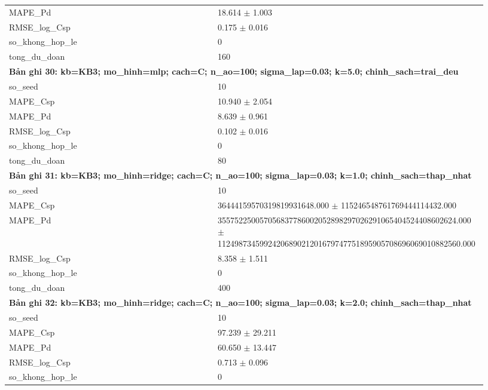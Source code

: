 \begin{longtable}{p{0.43\linewidth}p{0.50\linewidth}}
MAPE\_\allowbreak Pd & 18.614 $\pm$ 1.003 \\
RMSE\_\allowbreak log\_\allowbreak Csp & 0.175 $\pm$ 0.016 \\
so\_\allowbreak khong\_\allowbreak hop\_\allowbreak le & 0 \\
tong\_\allowbreak du\_\allowbreak doan & 160 \\
\midrule
\multicolumn{2}{p{0.95\linewidth}}{\textbf{Bản ghi 30: kb=KB3; mo\_hinh=mlp; cach=C; n\_ao=100; sigma\_lap=0.03; k=5.0; chinh\_sach=trai\_deu}} \\
so\_\allowbreak seed & 10 \\
MAPE\_\allowbreak Csp & 10.940 $\pm$ 2.054 \\
MAPE\_\allowbreak Pd & 8.639 $\pm$ 0.961 \\
RMSE\_\allowbreak log\_\allowbreak Csp & 0.102 $\pm$ 0.016 \\
so\_\allowbreak khong\_\allowbreak hop\_\allowbreak le & 0 \\
tong\_\allowbreak du\_\allowbreak doan & 80 \\
\midrule
\multicolumn{2}{p{0.95\linewidth}}{\textbf{Bản ghi 31: kb=KB3; mo\_hinh=ridge; cach=C; n\_ao=100; sigma\_lap=0.03; k=1.0; chinh\_sach=thap\_nhat}} \\
so\_\allowbreak seed & 10 \\
MAPE\_\allowbreak Csp & 36444159570319819931648.000 $\pm$ 115246548761769444114432.000 \\
MAPE\_\allowbreak Pd & 355752250057056837786002052898297026291065404524408602624.000 $\pm$ 1124987345992420689021201679747751895905708696069010882560.000 \\
RMSE\_\allowbreak log\_\allowbreak Csp & 8.358 $\pm$ 1.511 \\
so\_\allowbreak khong\_\allowbreak hop\_\allowbreak le & 0 \\
tong\_\allowbreak du\_\allowbreak doan & 400 \\
\midrule
\multicolumn{2}{p{0.95\linewidth}}{\textbf{Bản ghi 32: kb=KB3; mo\_hinh=ridge; cach=C; n\_ao=100; sigma\_lap=0.03; k=2.0; chinh\_sach=thap\_nhat}} \\
so\_\allowbreak seed & 10 \\
MAPE\_\allowbreak Csp & 97.239 $\pm$ 29.211 \\
MAPE\_\allowbreak Pd & 60.650 $\pm$ 13.447 \\
RMSE\_\allowbreak log\_\allowbreak Csp & 0.713 $\pm$ 0.096 \\
so\_\allowbreak khong\_\allowbreak hop\_\allowbreak le & 0 \\

\end{longtable}
